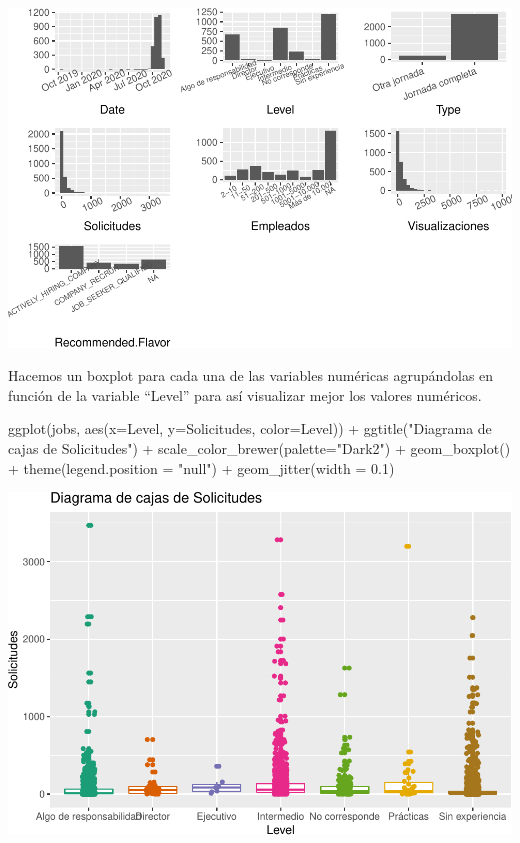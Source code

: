 \documentclass[
]{article}
\newenvironment{Shaded}{\begin{snugshade}}{\end{snugshade}}
\newcommand{\DataTypeTok}[1]{\textcolor[rgb]{0.87,0.87,0.75}{#1}}
\newcommand{\FloatTok}[1]{\textcolor[rgb]{0.75,0.75,0.82}{#1}}
\newcommand{\KeywordTok}[1]{\textcolor[rgb]{0.94,0.87,0.69}{#1}}
\newcommand{\NormalTok}[1]{\textcolor[rgb]{0.80,0.80,0.80}{#1}}
\newcommand{\OperatorTok}[1]{\textcolor[rgb]{0.94,0.94,0.82}{#1}}
\newcommand{\StringTok}[1]{\textcolor[rgb]{0.80,0.58,0.58}{#1}}
\begin{document}
\includegraphics{data_cleaning_files/figure-latex/unnamed-chunk-17-1.pdf}

Hacemos un boxplot para cada una de las variables numéricas agrupándolas
en función de la variable ``Level'' para así visualizar mejor los
valores numéricos.

\begin{Shaded}
\begin{Highlighting}[]
\KeywordTok{ggplot}\NormalTok{(jobs, }\KeywordTok{aes}\NormalTok{(}\DataTypeTok{x=}\NormalTok{Level, }\DataTypeTok{y=}\NormalTok{Solicitudes, }\DataTypeTok{color=}\NormalTok{Level)) }\OperatorTok{+}\StringTok{ }
\StringTok{  }\KeywordTok{ggtitle}\NormalTok{(}\StringTok{"Diagrama de cajas de Solicitudes"}\NormalTok{) }\OperatorTok{+}\StringTok{ }
\StringTok{  }\KeywordTok{scale\_color\_brewer}\NormalTok{(}\DataTypeTok{palette=}\StringTok{"Dark2"}\NormalTok{) }\OperatorTok{+}
\StringTok{  }\KeywordTok{geom\_boxplot}\NormalTok{() }\OperatorTok{+}
\StringTok{  }\KeywordTok{theme}\NormalTok{(}\DataTypeTok{legend.position =} \StringTok{"null"}\NormalTok{) }\OperatorTok{+}
\StringTok{  }\KeywordTok{geom\_jitter}\NormalTok{(}\DataTypeTok{width =} \FloatTok{0.1}\NormalTok{)}
\end{Highlighting}
\end{Shaded}

\includegraphics{data_cleaning_files/figure-latex/unnamed-chunk-18-1.pdf}
\end{document}
